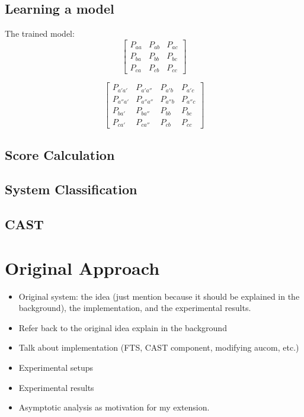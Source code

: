 \documentclass[11pt, a4paper]{report}
\begin{document}
\section{Learning a model}


The trained model:
\[
\begin{bmatrix}
  P_{aa} & P_{ab} & P_{ac}\\
  P_{ba} & P_{bb} & P_{bc}\\
  P_{ca} & P_{cb} & P_{cc}
\end{bmatrix}
\]

\[
\begin{bmatrix}
  P_{a'a'}  & P_{a'a''}  & P_{a'b}  & P_{a'c}\\
  P_{a''a'} & P_{a''a''} & P_{a''b} & P_{a''c}\\
  P_{ba'}   & P_{ba''}   & P_{bb}   & P_{bc}\\
  P_{ca'}   & P_{ca''}   & P_{cb}   &  P_{cc}
\end{bmatrix}
\]

\section{Score Calculation}
\section{System Classification}
\section{CAST}



\chapter{Original Approach}
\label{cha:orig-approach}

\begin{itemize}
\item Original system: the idea (just mention because it should be
  explained in the background), the implementation, and the
  experimental results.
\item Refer back to the original idea explain in the background
\item Talk about implementation (FTS, CAST component, modifying aucom, etc.)
\item Experimental setups
\item Experimental results
\item Asymptotic analysis as motivation for my extension.
\end{itemize}
\end{document}
